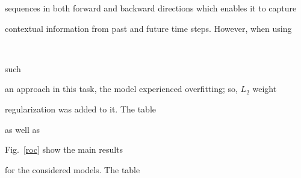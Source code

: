 sequences in both forward and backward directions which enables it to capture 

contextual information from past and future time steps. However, when using\linebreak\vspace*{-12pt}



\pagebreak



\



\vspace*{-12pt}




            

            \noindent

             such 

an approach in this task, the model experienced overfitting; so, $L_2$ weight 

regularization was added to it. The table %

as well as 

Fig.~\ref{roc} show the main results

             for the considered models. The table 

